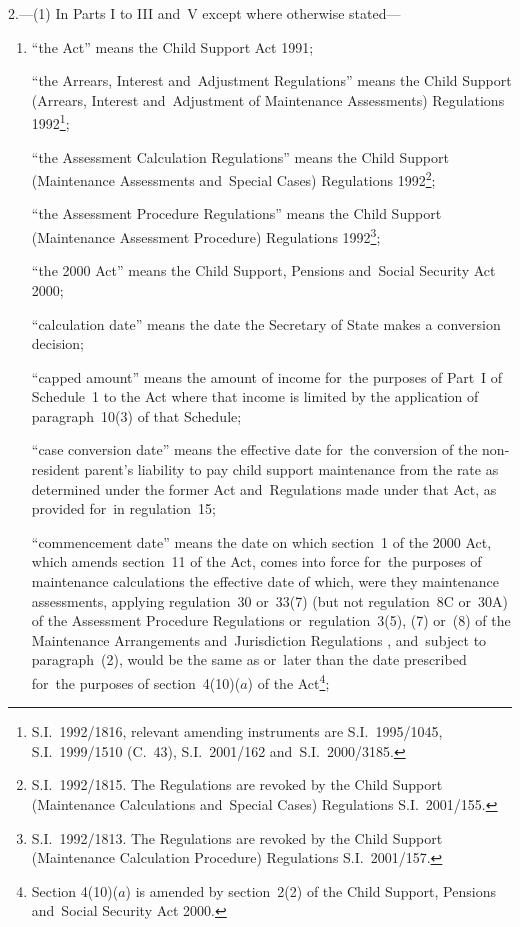 \documentclass[12pt,a4paper]{article}
\begin{document}
2.---(1)  In Parts I to III and~V except where otherwise stated—
\begin{enumerate}\item[]
“the Act” means the Child Support Act 1991;

“the Arrears, Interest and~Adjustment Regulations” means the Child Support (Arrears, Interest and~Adjustment of Maintenance Assessments) Regulations 1992\footnote{S.I.~1992/1816, relevant amending instruments are S.I.~1995/1045, S.I.~1999/1510 (C.\ 43), S.I.~2001/162 and~S.I.~2000/3185.};

“the Assessment Calculation Regulations” means the Child Support (Maintenance Assessments and~Special Cases) Regulations 1992\footnote{S.I.~1992/1815. The Regulations are revoked by the Child Support (Maintenance Calculations and~Special Cases) Regulations S.I.~2001/155.};

“the Assessment Procedure Regulations” means the Child Support (Maintenance Assessment Procedure) Regulations 1992\footnote{S.I.~1992/1813. The Regulations are revoked by the Child Support (Maintenance Calculation Procedure) Regulations S.I.~2001/157.};

“the 2000 Act” means the Child Support, Pensions and~Social Security Act 2000;

“calculation date” means the date the Secretary of State makes a conversion decision;

“capped amount” means the amount of income for~the purposes of Part~I of Schedule~1 to the Act where that income is limited by the application of paragraph~10(3) of that Schedule;

“case conversion date” means the effective date for~the conversion of the non-resident parent’s liability to pay child support maintenance from the rate as determined under the former Act and~Regulations made under that Act, as provided for~in regulation~15;

“commencement date” means the date on which section~1 of the 2000 Act, which amends section~11 of the Act, comes into force for~the purposes of maintenance calculations the effective date of which, were they maintenance assessments, applying 
regulation~30 or~33(7) (but not regulation~8C or~30A) of the Assessment Procedure Regulations or~regulation~3(5), (7) or~(8) of the Maintenance Arrangements and~Jurisdiction Regulations%
, and~subject to paragraph~(2), would be the same as or~later than the date prescribed for~the purposes of section~4(10)($a$)  of the Act\footnote{\frenchspacing Section 4(10)($a$) is amended by section~2(2) of the Child Support, Pensions and~Social Security Act 2000.};


\end{enumerate}
\end{document}
